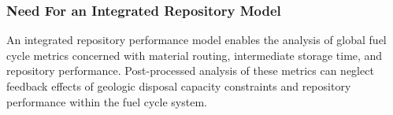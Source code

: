

\begin{frame}[ctb!]
  \frametitle{Need For an Integrated Repository Model}

  
An integrated repository performance model enables the analysis of global fuel 
cycle metrics concerned with material routing, intermediate storage time, and 
repository performance. Post-processed analysis of these metrics can neglect 
feedback effects of geologic disposal capacity constraints and repository 
performance within the fuel cycle system.

\end{frame}

